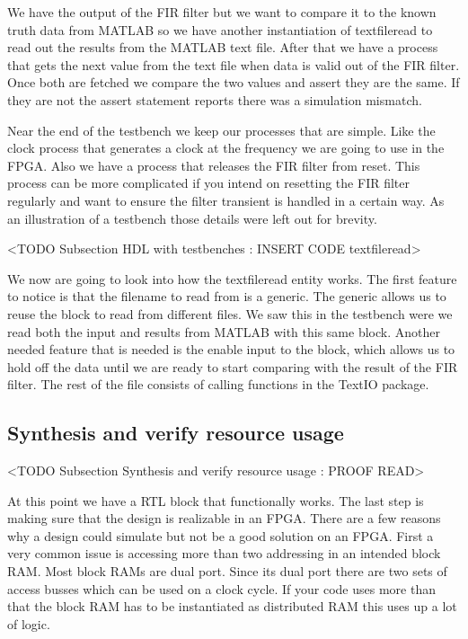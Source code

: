 We have the output of the \ac{FIR} filter but we want to compare it to the known truth data from MATLAB so we have another instantiation of textfileread to read out the results from the MATLAB text file. After that we have a process that gets the next value from the text file when data is valid out of the \ac{FIR} filter. Once both are fetched we compare the two values and assert they are the same. If they are not the assert statement reports there was a simulation mismatch.

Near the end of the testbench we keep our processes that are simple. Like the clock process that generates a clock at the frequency we are going to use in the \ac{FPGA}. Also we have a process that releases the \ac{FIR} filter from reset. This process can be more complicated if you intend on resetting the \ac{FIR} filter regularly and want to ensure the filter transient is handled in a certain way. As an illustration of a testbench those details were left out for brevity.

<TODO Subsection HDL with testbenches : INSERT CODE textfileread>

We now are going to look into how the textfileread entity works. The first feature to notice is that the filename to read from is a generic. The generic allows us to reuse the block to read from different files. We saw this in the testbench were we read both the input and results from MATLAB with this same block. Another needed feature that is needed is the enable input to the block, which allows us to hold off the data until we are ready to start comparing with the result of the \ac{FIR} filter. The rest of the file consists of calling functions in the TextIO package.
	
\subsection{Synthesis and verify resource usage}
	<TODO Subsection Synthesis and verify resource usage : PROOF READ>

At this point we have a \ac{RTL} block that functionally works. The last step is making sure that the design is realizable in an \ac{FPGA}. There are a few reasons why a design could simulate but not be a good solution on an \ac{FPGA}. First a very common issue is accessing more than two addressing in an intended block \ac{RAM}. Most block \ac{RAM}s are dual port. Since its dual port there are two sets of access busses which can be used on a clock cycle. If your code uses more than that the block \ac{RAM} has to be instantiated as distributed \ac{RAM} this uses up a lot of logic.


